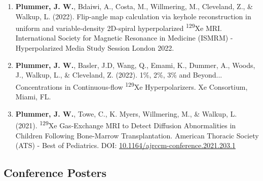 \documentclass[12pt,]{scrartcl}
\begin{document}
\begin{enumerate}
  \item \textbf{Plummer, J. W.}, Bdaiwi, A., Costa, M., Willmering, M., Cleveland, Z., \& Walkup, L. (2022). Flip-angle map calculation via keyhole reconstruction in uniform and variable-density 2D-spiral hyperpolarized \textsuperscript{129}Xe MRI. International Society for Magnetic Resonance in Medicine (ISMRM) - Hyperpolarized Media Study Session London 2022.
  
  \item \textbf{Plummer, J. W.}, Basler, J.D, Wang, Q., Emami, K., Dummer, A., Woods, J., Walkup, L., \& Cleveland, Z. (2022). 1\%, 2\%, 3\% and Beyond... Concentrations in Continuous-flow \textsuperscript{129}Xe Hyperpolarizers. Xe Consortium, Miami, FL.
  
  \item \textbf{Plummer, J. W.}, Towe, C., K. Myers, Willmering, M., \& Walkup, L. (2021). \textsuperscript{129}Xe Gas-Exchange MRI to Detect Diffusion Abnormalities in Children Following Bone-Marrow Transplantation. American Thoracic Society (ATS) - Best of Pediatrics. DOI: \href{http://dx.doi.org/10.1164/ajrccm-conference.2021.203.1_MeetingAbstracts.A1166}{10.1164/ajrccm-conference.2021.203.1}
  
  
\end{enumerate}



\subsection{Conference Posters}\label{conferences}
\end{document}
